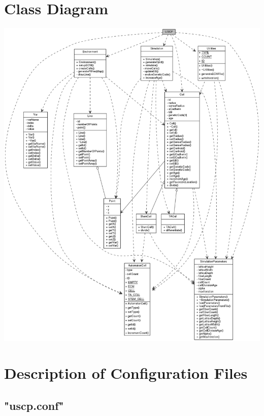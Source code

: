 \documentclass[11pt]{report}
\begin{document}
  \section{\color{red}Class Diagram}
    \includegraphics[width=7in]{../diag/classDiagram/class_diag.png}
  
  \section{\color{red}Description of Configuration Files}
  \subsection{\color{blue}"uscp.conf"}
\end{document}
